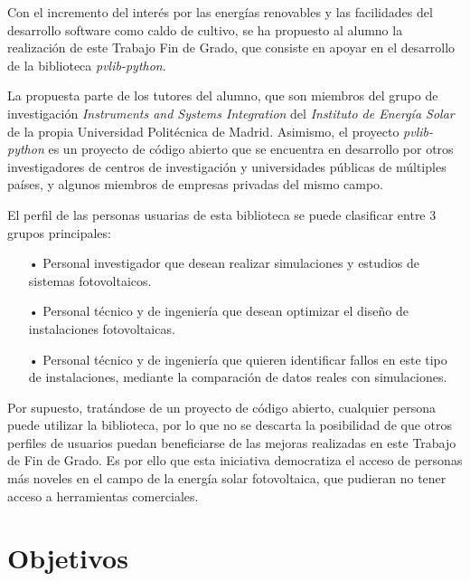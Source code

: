 Con el incremento del interés por las energías renovables y las facilidades del desarrollo software como caldo de cultivo, se ha propuesto al alumno la realización de este Trabajo Fin de Grado, que consiste en apoyar en el desarrollo de la biblioteca \textit{pvlib-python}.

La propuesta parte de los tutores del alumno, que son miembros del grupo de investigación \textit{Instruments and Systems Integration} del \textit{Instituto de Energía Solar} de la propia Universidad Politécnica de Madrid. Asimismo, el proyecto \textit{pvlib-python} es un proyecto de código abierto que se encuentra en desarrollo por otros investigadores de centros de investigación y universidades públicas de múltiples países, y algunos miembros de empresas privadas del mismo campo.

El perfil de las personas usuarias de esta biblioteca se puede clasificar entre 3 grupos principales:

\begin{itemize}

    \item[•] Personal investigador que desean realizar simulaciones y estudios de sistemas fotovoltaicos.

    \item[•] Personal técnico y de ingeniería que desean optimizar el diseño de instalaciones fotovoltaicas.

    \item[•] Personal técnico y de ingeniería que quieren identificar fallos en este tipo de instalaciones, mediante la comparación de datos reales con simulaciones.

\end{itemize}

Por supuesto, tratándose de un proyecto de código abierto, cualquier persona puede utilizar la biblioteca, por lo que no se descarta la posibilidad de que otros perfiles de usuarios puedan beneficiarse de las mejoras realizadas en este Trabajo de Fin de Grado. Es por ello que esta iniciativa democratiza el acceso de personas más noveles en el campo de la energía solar fotovoltaica, que pudieran no tener acceso a herramientas comerciales.


\section{Objetivos} \label{sct:intro:objetivos}

